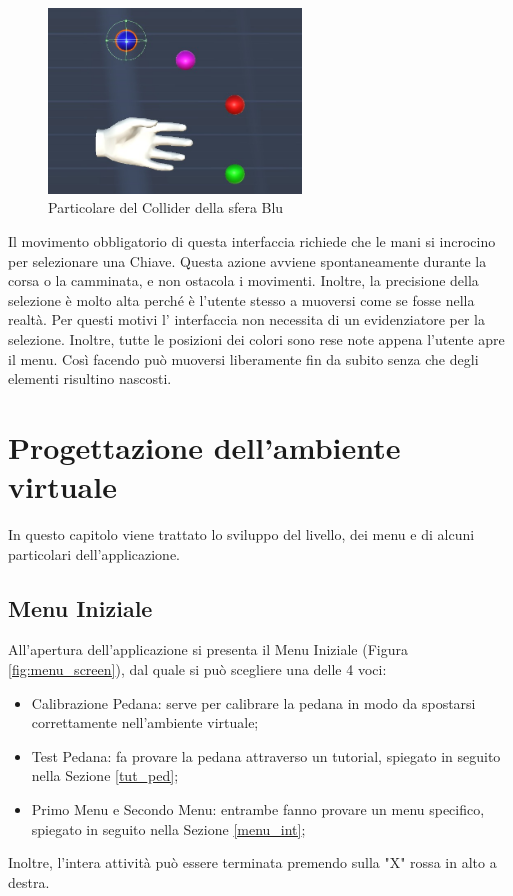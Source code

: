 \documentclass[target=bach,aauheader=]{thud}
\begin{document}
\begin{figure}[h]
    \centering
    \includegraphics[width=0.60\textwidth]{coll}
    \caption{Particolare del Collider della sfera Blu}
    \label{fig:coll}
\end{figure}

\newpage 
Il movimento obbligatorio di questa interfaccia richiede che le mani si incrocino per selezionare una Chiave.
Questa azione avviene spontaneamente durante la corsa o la camminata, e non ostacola i movimenti.
Inoltre, la precisione della selezione è molto alta perché è l'utente stesso a muoversi come se fosse nella realtà.
Per questi motivi l' interfaccia non necessita di un evidenziatore per la selezione.
Inoltre, tutte le posizioni dei colori sono rese note appena l'utente apre il menu.
Così facendo può muoversi liberamente fin da subito senza che degli elementi risultino nascosti. 

\chapter{Progettazione dell'ambiente virtuale} %

In questo capitolo viene trattato lo sviluppo del livello, dei menu e di alcuni particolari dell'applicazione.

\section{Menu Iniziale}
\label{menu_init}
All'apertura dell'applicazione si presenta il Menu Iniziale (Figura \ref{fig:menu_screen}), dal quale si può scegliere una delle 4 voci:
\begin{itemize}
    \item Calibrazione Pedana: serve per calibrare la pedana in modo da spostarsi correttamente nell'ambiente virtuale;
    \item Test Pedana: fa provare la pedana attraverso un tutorial, spiegato in seguito nella Sezione \ref{tut_ped};
    \item Primo Menu e Secondo Menu: entrambe fanno provare un menu specifico, spiegato in seguito nella Sezione \ref{menu_int};
\end{itemize} 
Inoltre, l'intera attività può essere terminata premendo sulla "X" rossa in alto a destra.
\end{document}

